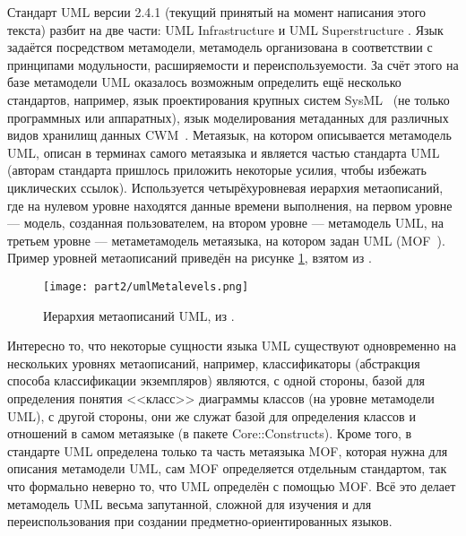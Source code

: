 Стандарт UML версии 2.4.1 (текущий принятый на момент написания этого текста) разбит 
на две части: UML Infrastructure \cite{omg2011infrastructure} и UML Superstructure 
\cite{omg2011superstructure}. Язык задаётся посредством метамодели, метамодель организована 
в соответствии с принципами модульности, расширяемости и переиспользуемости. За счёт 
этого на базе метамодели UML оказалось возможным определить ещё несколько стандартов, например, язык 
проектирования крупных систем SysML~\cite{sysml} (не только программных или аппаратных), 
язык моделирования метаданных для различных видов хранилищ данных CWM~\cite{cwm}. 
Метаязык, на котором описывается метамодель UML, описан в терминах самого метаязыка и является 
частью стандарта UML (авторам стандарта пришлось приложить некоторые усилия, чтобы 
избежать циклических ссылок). Используется четырёхуровневая иерархия метаописаний, 
где на нулевом уровне находятся данные времени выполнения, на первом уровне --- модель, 
созданная пользователем, на втором уровне --- метамодель UML, на третьем уровне --- 
метаметамодель метаязыка, на котором задан UML (MOF~\cite{mof}). Пример уровней метаописаний 
приведён на рисунке \ref{umlMetalevels}, взятом из \cite{omg2011infrastructure}.

\begin{figure} [ht]
	\begin{center}
		\texttt{[image: part2/umlMetalevels.png]}
		\caption{Иерархия метаописаний UML, из \cite{omg2011infrastructure}.}
		\label{umlMetalevels}
	\end{center}
\end{figure}

Интересно то, что некоторые сущности языка UML существуют одновременно на нескольких 
уровнях метаописаний, например, классификаторы (абстракция способа классификации экземпляров) 
являются, с одной стороны, базой для определения понятия <<класс>> диаграммы классов 
(на уровне метамодели UML), с другой стороны, они же служат базой для определения 
классов и отношений в самом метаязыке (в пакете Core::Constructs). Кроме того, в стандарте 
UML определена только та часть метаязыка MOF, которая нужна для описания метамодели UML, 
сам MOF определяется отдельным стандартом, так что формально неверно то, что UML определён 
с помощью MOF. Всё это делает метамодель UML весьма запутанной, сложной для изучения 
и для переиспользования при создании предметно-ориентированных языков.

